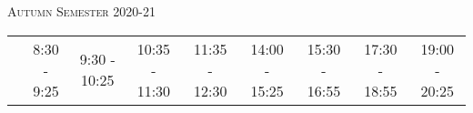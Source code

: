 \documentclass{article}
\title{}
\author{}
\date{}
\begin{document}
\begin{center}
\begin{Huge}
	\textsc{Autumn Semester 2020-21}\\			%
\end{Huge}
\vspace{0.5cm}
\begin{tabular}{|c||c|c|c|c||c|c||c|c|}
\hline
& 8:30 - 9:25 & 9:30 - 10:25 & 10:35 - 11:30 & 11:35 - 12:30 & 14:00 - 15:25 & 15:30 - 16:55 & 17:30 - 18:55 & 19:00 - 20:25\\
 
 
\end{tabular}
\end{center}
\end{document}
